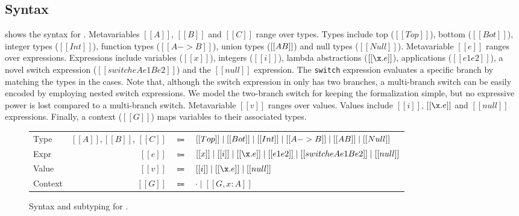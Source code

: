 \subsection{Syntax}\label{sec:union:syntax}
 shows the syntax for \name. Metavariables
$[[A]]$, $[[B]]$ and $[[C]]$ range over types.  Types include top ($[[Top]]$),
bottom ($[[Bot]]$), integer types ($[[Int]]$), function types ($[[A -> B]]$), union types ($[[A \/ B]]$)
and null types ($[[Null]]$). Metavariable $[[e]]$ ranges over
expressions. Expressions include variables ($[[x]]$), integers
($[[i]]$), lambda abstractions
($[[\x.e]]$), applications ($[[e1 e2]]$), a novel switch expression
($[[switch e A e1 B e2]]$) and the $[[null]]$ expression.
The \lstinline{switch} expression evaluates a specific branch by matching the types in the cases.
Note that, although
the switch expression in \name only has two branches, a multi-branch switch
can be easily encoded by employing nested switch expressions. We model
the two-branch switch for keeping the formalization simple, but no expressive power is lost
compared to a multi-branch switch.
Metavariable $[[v]]$ ranges over values. Values include
$[[i]]$, $[[\x.e]]$ and $[[null]]$ expressions.
Finally, a context ($[[G]]$) maps variables to their associated types.


\begin{figure}[t]
  \begin{small}
    \centering
    \begin{tabular}{lrcl} \toprule
      Type & $[[A]], [[B]]$, $[[C]]$ & $\Coloneqq$ & $ [[Top]] \mid [[Bot]] \mid [[Int]] \mid [[A -> B]] \mid [[A \/ B]] \mid [[Null]] $ \\
      Expr & $[[e]]$ & $\Coloneqq$ & $[[x]] \mid [[i]] \mid [[\x.e]] \mid [[e1 e2]] \mid [[switch e A e1 B e2]] \mid [[null]]$\\
      Value & $[[v]]$ & $\Coloneqq$ & $[[i]] \mid [[\x.e]] \mid [[null]] $\\
      Context & $[[G]]$ & $\Coloneqq$ & $ \cdot \mid [[G , x : A]]$ \\
      \bottomrule
    \end{tabular}
  \end{small}
  \begin{small}
    \centering
  \end{small}
  \caption{Syntax and subtyping for \name.}
  \label{fig:union:syntax}
\end{figure}

